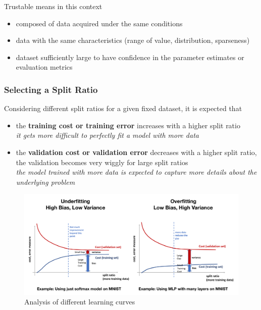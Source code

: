 \documentclass[11pt]{article}
\begin{document}
Trustable means in this context
\begin{itemize}
	\item composed of data acquired under the same conditions
	\item data with the same characteristics (range of value, distribution, sparseness)
	\item dataset sufficiently large to have confidence in the parameter estimates or evaluation metrics
\end{itemize}

\subsubsection{Selecting a Split Ratio}
Considering different split ratios for a given fixed dataset, it is expected that
\begin{itemize}
	\item the \textbf{training cost or training error} increases with a higher split ratio\\
		\emph{it gets more difficult to perfectly fit a model with more data}
	\item the \textbf{validation cost or validation error} decreases with a higher split ratio, the validation becomes very wiggly for large split ratios\\
		\emph{the model trained with more data is expected to capture more details about the underlying problem}
\end{itemize}

\begin{figure}[H]
	\centering
	\includegraphics[width=0.9\linewidth, keepaspectratio]{learning_curve_analysis}
	\caption{Analysis of different learning curves}
	\label{fig:learningcurveanalysis}
\end{figure}
\end{document}
